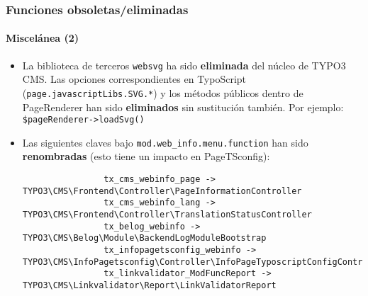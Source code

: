 
\begin{frame}[fragile]
	\frametitle{Funciones obsoletas/eliminadas}
	\framesubtitle{Miscelánea (2)}

	\lstset{basicstyle=\tiny\ttfamily}

	\begin{itemize}

		\item La biblioteca de terceros \texttt{websvg} ha sido \textbf{eliminada}
			del núcleo de TYPO3 CMS. Las opciones correspondientes en TypoScript  
			(\texttt{page.javascriptLibs.SVG.*}) y los métodos públicos dentro de
			PageRenderer han sido \textbf{eliminados} sin sustitución también.\newline
			Por ejemplo: \texttt{\$pageRenderer->loadSvg()}

		\item Las siguientes claves bajo \texttt{mod.web\_info.menu.function}
			han sido \textbf{renombradas} (esto tiene un impacto en PageTSconfig):

			\begin{lstlisting}
				tx_cms_webinfo_page -> TYPO3\CMS\Frontend\Controller\PageInformationController
				tx_cms_webinfo_lang -> TYPO3\CMS\Frontend\Controller\TranslationStatusController
				tx_belog_webinfo -> TYPO3\CMS\Belog\Module\BackendLogModuleBootstrap
				tx_infopagetsconfig_webinfo -> TYPO3\CMS\InfoPagetsconfig\Controller\InfoPageTyposcriptConfigController
				tx_linkvalidator_ModFuncReport -> TYPO3\CMS\Linkvalidator\Report\LinkValidatorReport
			\end{lstlisting}

	\end{itemize}

\end{frame}



